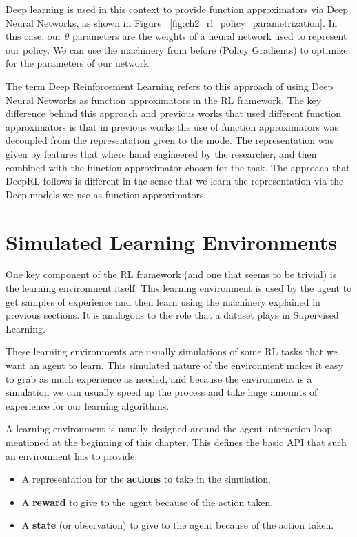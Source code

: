 Deep learning is used in this context to provide function approximators via Deep
Neural Networks, as shown in Figure ~\ref{fig:ch2_rl_policy_parametrization}. 
In this case, our $\theta$ parameters are the weights of a neural network used 
to represent our policy. We can use the machinery from before (Policy Gradients)
to optimize for the parameters of our network.

\figRlPolicyParametrization

The term Deep Reinforcement Learning refers to this approach of using Deep Neural Networks
as function approximators in the RL framework. The key difference behind this approach
and previous works that used different function approximators is that in previous works
the use of function approximators was decoupled from the representation given to the mode.
The representation was given by features that where hand engineered by the researcher, and then
combined with the function approximator chosen for the task. The approach that DeepRL follows is 
different in the sense that we learn the representation via the Deep models we use as function approximators. 

\section{Simulated Learning Environments}

One key component of the RL framework (and one that seems to be trivial) is the learning
environment itself. This learning environment is used by the agent to get samples of
experience and then learn using the machinery explained in previous sections. It is analogous
to the role that a dataset plays in Supervised Learning.

These learning environments are usually simulations of some RL tasks that we want an
agent to learn. This simulated nature of the environment makes it easy to grab as much 
experience as needed, and because the environment is a simulation we can usually
speed up the process and take huge amounts of experience for our learning algorithms.

A learning environment is usually designed around the agent interaction loop mentioned
at the beginning of this chapter. This defines the basic API that such an environment
has to provide:

\begin{itemize}
    \item A representation for the \textbf{actions} to take in the simulation.
    \item A \textbf{reward} to give to the agent because of the action taken.
    \item A \textbf{state} (or observation) to give to the agent because of the action taken.
\end{itemize}

